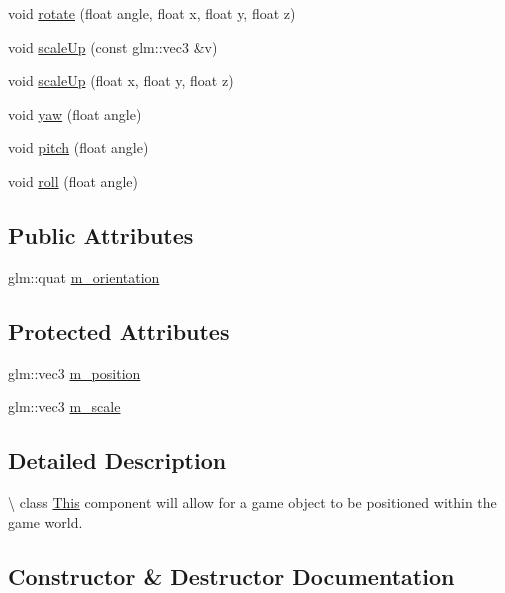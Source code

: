 \begin{DoxyCompactItemize}
\item 
void \mbox{\hyperlink{class_transform_component_a7c97e7f1e9924b811319acb73accde72}{rotate}} (float angle, float x, float y, float z)
\item 
void \mbox{\hyperlink{class_transform_component_a45483b2f5f38819ad0db6fcfe0f0ded8}{scale\+Up}} (const glm\+::vec3 \&v)
\item 
void \mbox{\hyperlink{class_transform_component_a161374892f674b2e6d34bcaeb66a2a28}{scale\+Up}} (float x, float y, float z)
\item 
void \mbox{\hyperlink{class_transform_component_ae32c6f3f18b81fc712629fb689d61252}{yaw}} (float angle)
\item 
void \mbox{\hyperlink{class_transform_component_ad363ec339461bde470fcc50103d12ba7}{pitch}} (float angle)
\item 
void \mbox{\hyperlink{class_transform_component_ae38356794f70a3838b7c690d3bb0bef7}{roll}} (float angle)
\end{DoxyCompactItemize}
\subsection*{Public Attributes}
\begin{DoxyCompactItemize}
\item 
glm\+::quat \mbox{\hyperlink{class_transform_component_a70f27f66f621e0e52e96e40ec168ede2}{m\+\_\+orientation}}
\end{DoxyCompactItemize}
\subsection*{Protected Attributes}
\begin{DoxyCompactItemize}
\item 
glm\+::vec3 \mbox{\hyperlink{class_transform_component_a5a441b52ff5f18d940e3351e35868481}{m\+\_\+position}}
\item 
glm\+::vec3 \mbox{\hyperlink{class_transform_component_a50d168d6290b29a66b21ce576fa44d59}{m\+\_\+scale}}
\end{DoxyCompactItemize}


\subsection{Detailed Description}
\textbackslash{} class \mbox{\hyperlink{class_this}{This}} component will allow for a game object to be positioned within the game world. 

\subsection{Constructor \& Destructor Documentation}
\mbox{\label{class_transform_component_ace1cf2d7d2a7468e9cb3eb0ce382f446}} 
